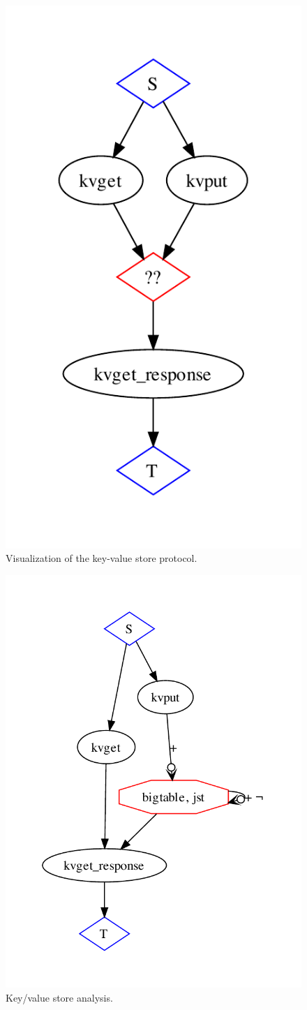 \begin{figure}[t]
\centering
\includegraphics[width=0.4\linewidth]{fig/kvs_proto_pdg.pdf}
\vspace{-10pt}
\caption{Visualization of the key-value store protocol.}
\label{fig:pdg-kvs-proto-analysis}
\vspace{-2pt}
\end{figure}

\begin{figure}[t]
\centering
\includegraphics[width=0.5\linewidth]{fig/basickvs.pdf}
\vspace{-10pt}
\caption{Key/value store analysis.}
\label{fig:pdg-kvs-analysis}
\vspace{-2pt}
\end{figure}